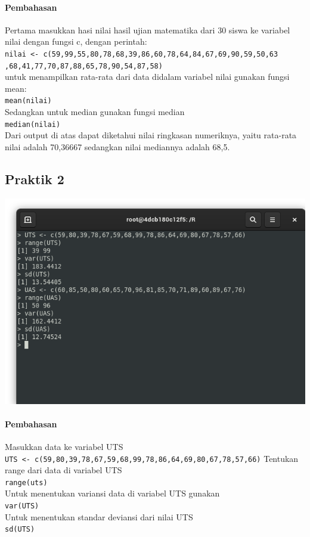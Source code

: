 \documentclass[a4paper,12pt]{article}
\begin{document}
\paragraph{Pembahasan\\}
Pertama masukkan hasi nilai hasil ujian matematika dari 30 siswa ke variabel nilai dengan fungsi c, dengan perintah:\\
\texttt{nilai <- c(59,99,55,80,78,68,39,86,60,78,64,84,67,69,90,59,50,63
	,68,41,77,70,87,88,65,78,90,54,87,58)}\\
untuk menampilkan rata-rata dari data didalam variabel nilai gunakan fungsi mean:\\
\texttt{mean(nilai)}\\
Sedangkan untuk median gunakan fungsi median\\
\texttt{median(nilai)}\\
Dari output di atas dapat diketahui nilai ringkasan numeriknya, yaitu rata-rata nilai  adalah 70,36667 sedangkan nilai mediannya adalah 68,5.

\subsection{Praktik 2}
\begin{center}
	\includegraphics[scale=.6]{praktik02}
\end{center}
\paragraph{Pembahasan\\}
Masukkan data ke variabel UTS\\
\texttt{UTS <- c(59,80,39,78,67,59,68,99,78,86,64,69,80,67,78,57,66)}
Tentukan range dari data di variabel UTS\\
\texttt{range(uts)}\\
Untuk menentukan variansi data di variabel UTS gunakan\\
\texttt{var(UTS)}\\
Untuk menentukan standar deviansi dari nilai UTS\\
\texttt{sd(UTS)}
\end{document}
